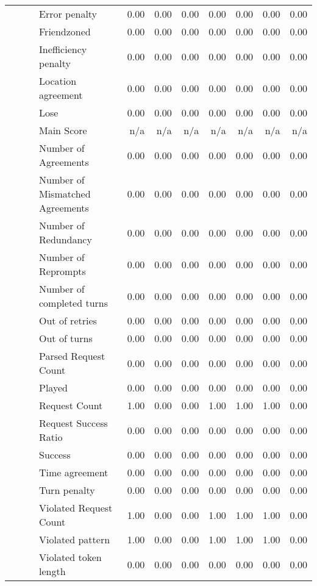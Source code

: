\begin{tabular}{llllrrrrrrr}
 &  &  & Error penalty & 0.00 & 0.00 & 0.00 & 0.00 & 0.00 & 0.00 & 0.00 \\
 &  &  & Friendzoned & 0.00 & 0.00 & 0.00 & 0.00 & 0.00 & 0.00 & 0.00 \\
 &  &  & Inefficiency penalty & 0.00 & 0.00 & 0.00 & 0.00 & 0.00 & 0.00 & 0.00 \\
 &  &  & Location agreement & 0.00 & 0.00 & 0.00 & 0.00 & 0.00 & 0.00 & 0.00 \\
 &  &  & Lose & 0.00 & 0.00 & 0.00 & 0.00 & 0.00 & 0.00 & 0.00 \\
 &  &  & Main Score & n/a & n/a & n/a & n/a & n/a & n/a & n/a \\
 &  &  & Number of Agreements & 0.00 & 0.00 & 0.00 & 0.00 & 0.00 & 0.00 & 0.00 \\
 &  &  & Number of Mismatched Agreements & 0.00 & 0.00 & 0.00 & 0.00 & 0.00 & 0.00 & 0.00 \\
 &  &  & Number of Redundancy & 0.00 & 0.00 & 0.00 & 0.00 & 0.00 & 0.00 & 0.00 \\
 &  &  & Number of Reprompts & 0.00 & 0.00 & 0.00 & 0.00 & 0.00 & 0.00 & 0.00 \\
 &  &  & Number of completed turns & 0.00 & 0.00 & 0.00 & 0.00 & 0.00 & 0.00 & 0.00 \\
 &  &  & Out of retries & 0.00 & 0.00 & 0.00 & 0.00 & 0.00 & 0.00 & 0.00 \\
 &  &  & Out of turns & 0.00 & 0.00 & 0.00 & 0.00 & 0.00 & 0.00 & 0.00 \\
 &  &  & Parsed Request Count & 0.00 & 0.00 & 0.00 & 0.00 & 0.00 & 0.00 & 0.00 \\
 &  &  & Played & 0.00 & 0.00 & 0.00 & 0.00 & 0.00 & 0.00 & 0.00 \\
 &  &  & Request Count & 1.00 & 0.00 & 0.00 & 1.00 & 1.00 & 1.00 & 0.00 \\
 &  &  & Request Success Ratio & 0.00 & 0.00 & 0.00 & 0.00 & 0.00 & 0.00 & 0.00 \\
 &  &  & Success & 0.00 & 0.00 & 0.00 & 0.00 & 0.00 & 0.00 & 0.00 \\
 &  &  & Time agreement & 0.00 & 0.00 & 0.00 & 0.00 & 0.00 & 0.00 & 0.00 \\
 &  &  & Turn penalty & 0.00 & 0.00 & 0.00 & 0.00 & 0.00 & 0.00 & 0.00 \\
 &  &  & Violated Request Count & 1.00 & 0.00 & 0.00 & 1.00 & 1.00 & 1.00 & 0.00 \\
 &  &  & Violated pattern & 1.00 & 0.00 & 0.00 & 1.00 & 1.00 & 1.00 & 0.00 \\
 &  &  & Violated token length & 0.00 & 0.00 & 0.00 & 0.00 & 0.00 & 0.00 & 0.00 \\

\end{tabular}
